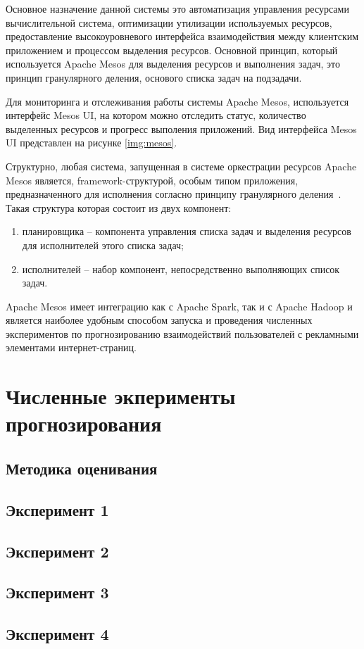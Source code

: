 Основное назначение данной системы это автоматизация управления ресурсами вычислительной система, оптимизации
утилизации используемых ресурсов, предоставление высокоуровневого интерфейса взаимодействия между клиентским
приложением и процессом выделения ресурсов. Основной принцип, который используется Apache Mesos для выделения ресурсов и выполнения задач, это принцип
гранулярного деления, основого списка задач на подзадачи.

Для мониторинга и отслеживания работы системы Apache Mesos, используется интерфейс Mesos UI,
на котором можно отследить статус, количество выделенных ресурсов и прогресс выполения приложений.
Вид интерфейса Mesos UI представлен на рисунке \ref{img:mesos}.


Структурно, любая система, запущенная в системе оркестрации ресурсов Apache Mesos является, 
framework-структурой, особым типом приложения, предназначенного для исполнения
согласно принципу гранулярного деления~\autocite{impl:mesos}. Такая структура которая состоит из двух компонент:
\begin{enumerate}
    \item планировщика -- компонента управления списка задач и выделения ресурсов для исполнителей этого списка задач;
    \item исполнителей -- набор компонент, непосредственно выполняющих список задач.
\end{enumerate}  

Apache Mesos имеет интеграцию как с Apache Spark, так и с Apache Hadoop и является наиболее удобным
способом запуска и проведения численных экспериментов по прогнозированию взаимодействий пользователей
с рекламными элементами интернет-страниц.

\section{Численные экперименты прогнозирования}
\subsection{Методика оценивания}
\subsection{Эксперимент 1}
\subsection{Эксперимент 2}
\subsection{Эксперимент 3}
\subsection{Эксперимент 4}